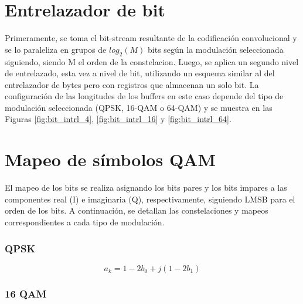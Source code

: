 
	\section{Entrelazador de bit}
	Primeramente, se toma el bit-stream resultante de la codificación convolucional y se lo paraleliza en grupos de $log_2(M)$ bits según la modulación seleccionada siguiendo, siendo M el orden de la constelacion. Luego, se aplica un segundo nivel de entrelazado, esta vez a nivel de bit, utilizando un esquema similar al del entrelazador de bytes pero con registros que almacenan un solo bit. La configuración de las longitudes de los buffers en este caso depende del tipo de modulación seleccionada (QPSK, 16-QAM o 64-QAM) y se muestra en las Figuras \ref{fig:bit_intrl_4}, \ref{fig:bit_intrl_16} y \ref{fig:bit_intrl_64}.





	\section{Mapeo de símbolos QAM}

	El mapeo de los bits se realiza asignando los bits pares y los bits impares a las componentes real (I) e imaginaria (Q), respectivamente, siguiendo LMSB para el orden de los bits. A continuación, se detallan las constelaciones y mapeos correspondientes a cada tipo de modulación.
	\subsubsection{QPSK}
	\begin{equation}
		a_k = 1 - 2  b_0  +j (1 - 2 b_1)
	\end{equation}


	\subsubsection{16 QAM}

